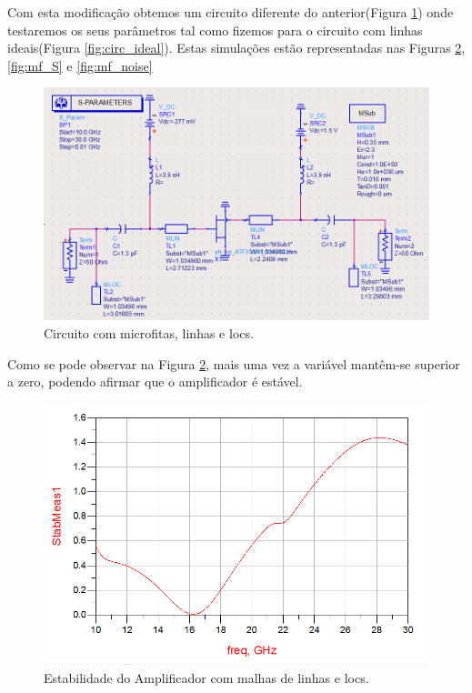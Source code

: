 \documentclass[11pt]{article}
\numberwithin{equation}{section}
\begin{document}

Com esta modificação obtemos um circuito diferente do anterior(Figura \ref{fig:circuito_mf}) onde testaremos os seus parâmetros tal como fizemos para o circuito com linhas ideais(Figura \ref{fig:circ_ideal}). Estas simulações estão representadas nas Figuras \ref{fig:mf_est}, \ref{fig:mf_S} e \ref{fig:mf_noise}

\begin{figure}[H]
	\centering
	\includegraphics[keepaspectratio=true, scale=0.45]{exps/Circuito_mf}
	\vspace{-0.5em}
	\caption{Circuito com microfitas, linhas e locs.}
	\vspace{-0.8em}
	\label{fig:circuito_mf}
\end{figure}

Como se pode observar na Figura \ref{fig:mf_est}, mais uma vez a variável mantêm-se superior a zero, podendo afirmar que o amplificador é estável.

\begin{figure}[H]
	\centering
	\includegraphics[keepaspectratio=true, scale=0.45]{exps/mf_estab}
	\vspace{-0.5em}
	\caption{Estabilidade do Amplificador com malhas de linhas e locs.}
	\vspace{-0.8em}
	\label{fig:mf_est}
\end{figure}
\end{document}
